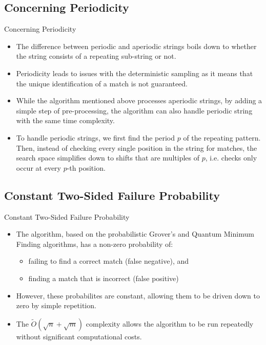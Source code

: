 \documentclass{beamer}
\begin{document}
\subsection{Concerning Periodicity}
\begin{frame}{Concerning Periodicity}
  \begin{itemize}
    \item The difference between periodic and aperiodic strings boils down to whether the string consists of a repeating sub-string or not.
    \item Periodicity leads to issues with the deterministic sampling as it means that the unique identification of a match is not guaranteed.
    \item While the algorithm mentioned above processes aperiodic strings, by adding a simple step of pre-processing, the algorithm can also handle periodic string with the same time complexity.

    \item To handle periodic strings, we first find the period $p$ of the repeating pattern. Then, instead of checking every single position in the string for matches, the search space simplifies down to shifts that are multiples of $p$, i.e. checks only occur at every $p$-th position.
  \end{itemize}
\end{frame}

\subsection{Constant Two-Sided Failure Probability}
\begin{frame}{Constant Two-Sided Failure Probability}
  \begin{itemize}
    \item The algorithm, based on the probabilistic Grover's and Quantum Minimum Finding algorithms, has a non-zero probability of:
          \begin{itemize}
            \item failing to find a correct match (false negative), and
            \item finding a match that is incorrect (false positive)
          \end{itemize}

    \item However, these probabilites are constant, allowing them to be driven down to zero by simple repetition.
    \item The $\widetilde{O} (\sqrt{n} + \sqrt{m})$ complexity allows the algorithm to be run repeatedly without significant computational costs.
  \end{itemize}
\end{frame}
\end{document}
